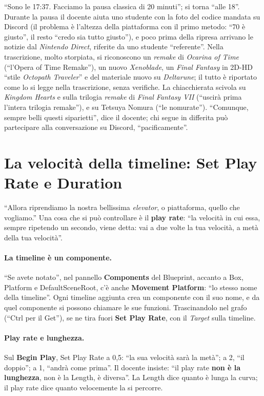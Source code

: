 ``Sono le 17:37. Facciamo la pausa classica di 20 minuti''; si torna ``alle 18''. Durante
la pausa il docente aiuta uno studente con la foto del codice mandata su Discord (il
problema è l'altezza della piattaforma con il primo metodo: ``70 è giusto'', il resto
``credo sia tutto giusto''), e poco prima della ripresa arrivano le notizie dal
\emph{Nintendo Direct}, riferite da uno studente ``referente''. Nella trascrizione,
molto storpiata, si riconoscono un \emph{remake} di \emph{Ocarina of Time} (``l'Opera of
Time Remake''), un nuovo \emph{Xenoblade}, un \emph{Final Fantasy} in 2D-HD ``stile
\emph{Octopath Traveler}'' e del materiale nuovo su \emph{Deltarune}; il tutto è riportato
come lo si legge nella trascrizione, senza verifiche. La chiacchierata scivola su
\emph{Kingdom Hearts} e sulla trilogia \emph{remake} di \emph{Final Fantasy VII} (``uscirà
prima l'intera trilogia remake''), e su Tetsuya Nomura (``le nomurate''). ``Comunque,
sempre belli questi siparietti'', dice il docente; chi segue in differita può
partecipare alla conversazione su Discord, ``pacificamente''.

\section{La velocità della timeline: Set Play Rate e Duration}
\label{ue6:sec:playrate}

``Allora riprendiamo la nostra bellissima \emph{elevator}, o piattaforma, quello che
vogliamo.'' Una cosa che si può controllare è il \textbf{play rate}: ``la velocità in cui
essa, sempre ripetendo un secondo, viene detta: vai a due volte la tua velocità, a metà
della tua velocità''.

\paragraph{La timeline è un componente.} ``Se avete notato'', nel pannello
\textbf{Components} del Blueprint, accanto a Box, Platform e DefaultSceneRoot, c'è anche
\textbf{Movement Platform}: ``lo stesso nome della timeline''. Ogni timeline aggiunta
crea un componente con il suo nome, e da quel componente si possono chiamare le sue
funzioni. Trascinandolo nel grafo (``Ctrl per il Get''), se ne tira fuori \textbf{Set
Play Rate}, con il \emph{Target} sulla timeline.

\paragraph{Play rate e lunghezza.} Sul \textbf{Begin Play}, Set Play Rate a 0,5: ``la
sua velocità sarà la metà''; a 2, ``il doppio''; a 1, ``andrà come prima''. Il docente
insiste: ``il play rate \textbf{non è la lunghezza}, non è la Length, è diversa''. La
Length dice quanto è lunga la curva; il play rate dice quanto velocemente la si
percorre.

